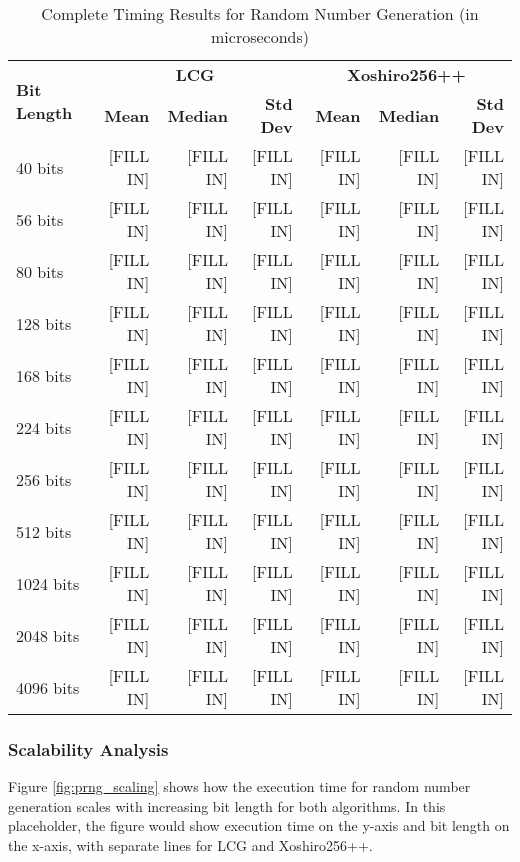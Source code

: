 \begin{table}[H]
\centering
\caption{Complete Timing Results for Random Number Generation (in microseconds)}
\label{tab:prng_complete}
\begin{tabular}{@{}lrrrrrr@{}}
\toprule
\multirow{2}{*}{\textbf{Bit Length}} & \multicolumn{3}{c}{\textbf{LCG}} & \multicolumn{3}{c}{\textbf{Xoshiro256++}} \\
\cmidrule(lr){2-4} \cmidrule(lr){5-7}
& \textbf{Mean} & \textbf{Median} & \textbf{Std Dev} & \textbf{Mean} & \textbf{Median} & \textbf{Std Dev} \\
\midrule
40 bits     & [FILL IN] & [FILL IN] & [FILL IN] & [FILL IN] & [FILL IN] & [FILL IN] \\
56 bits     & [FILL IN] & [FILL IN] & [FILL IN] & [FILL IN] & [FILL IN] & [FILL IN] \\
80 bits     & [FILL IN] & [FILL IN] & [FILL IN] & [FILL IN] & [FILL IN] & [FILL IN] \\
128 bits    & [FILL IN] & [FILL IN] & [FILL IN] & [FILL IN] & [FILL IN] & [FILL IN] \\
168 bits    & [FILL IN] & [FILL IN] & [FILL IN] & [FILL IN] & [FILL IN] & [FILL IN] \\
224 bits    & [FILL IN] & [FILL IN] & [FILL IN] & [FILL IN] & [FILL IN] & [FILL IN] \\
256 bits    & [FILL IN] & [FILL IN] & [FILL IN] & [FILL IN] & [FILL IN] & [FILL IN] \\
512 bits    & [FILL IN] & [FILL IN] & [FILL IN] & [FILL IN] & [FILL IN] & [FILL IN] \\
1024 bits   & [FILL IN] & [FILL IN] & [FILL IN] & [FILL IN] & [FILL IN] & [FILL IN] \\
2048 bits   & [FILL IN] & [FILL IN] & [FILL IN] & [FILL IN] & [FILL IN] & [FILL IN] \\
4096 bits   & [FILL IN] & [FILL IN] & [FILL IN] & [FILL IN] & [FILL IN] & [FILL IN] \\
\bottomrule
\end{tabular}
\end{table}

\subsubsection{Scalability Analysis}

Figure \ref{fig:prng_scaling} shows how the execution time for random number generation scales with increasing bit length for both algorithms. In this placeholder, the figure would show execution time on the y-axis and bit length on the x-axis, with separate lines for LCG and Xoshiro256++.

